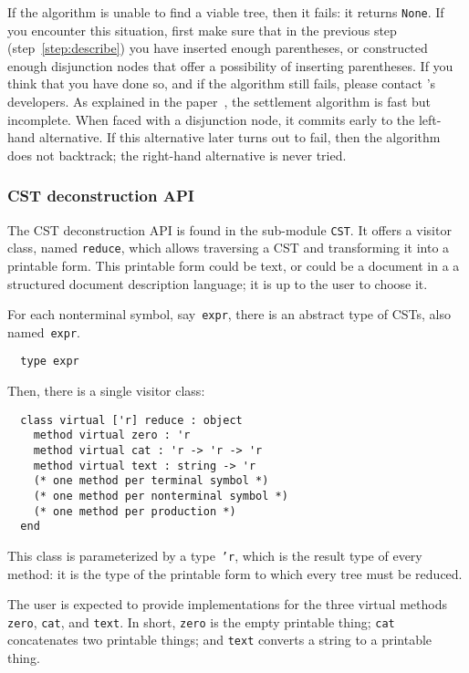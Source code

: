 If the algorithm is unable to find a viable tree, then it fails: it returns
\texttt{None}. If you encounter this situation, first make sure that in the
previous step (step~\ref{step:describe}) you have inserted enough parentheses,
or constructed enough disjunction nodes that offer a possibility of inserting
parentheses. If you think that you have done so, and if the algorithm still
fails, please contact \menhir's developers. As explained in the
paper~\cite{pottier-unparsing-24}, the settlement algorithm is fast but
incomplete. When faced with a disjunction node, it commits early to the
left-hand alternative. If this alternative later turns out to fail, then the
algorithm does not backtrack; the right-hand alternative is never tried.

\subsubsection{CST deconstruction API}

The CST deconstruction API is found in the sub-module \texttt{CST}. It offers
a visitor class, named \texttt{reduce}, which allows traversing a CST and
transforming it into a printable form. This printable form could be text, or
could be a document in a a structured document description language; it is up
to the user to choose it.

For each nonterminal symbol, say~\texttt{expr},
there is an abstract type of CSTs, also named~\texttt{expr}.
\begin{verbatim}
  type expr
\end{verbatim}

Then, there is a single visitor class:
\begin{verbatim}
  class virtual ['r] reduce : object
    method virtual zero : 'r
    method virtual cat : 'r -> 'r -> 'r
    method virtual text : string -> 'r
    (* one method per terminal symbol *)
    (* one method per nonterminal symbol *)
    (* one method per production *)
  end
\end{verbatim}

This class is parameterized by a type~\texttt{'r},
which is the result type of every method:
it is the type of the printable form
to which every tree must be reduced.

The user is expected to provide implementations
for the three virtual methods \texttt{zero},
\texttt{cat}, and \texttt{text}.
In short,
\texttt{zero} is the empty printable thing;
\texttt{cat} concatenates two printable things;
and
\texttt{text} converts a string to a printable thing.

